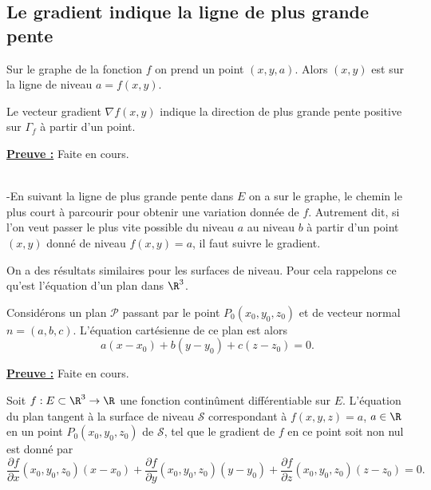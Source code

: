 \documentclass[class=report,crop=false]{standalone}
\begin{document}
\subsection{Le gradient indique la ligne de plus grande pente}
\noindent Sur le graphe de la fonction $f$ on prend un point $(x,y,a)$. Alors $(x,y)$
est sur la ligne de niveau $a=f(x,y)$.

 \begin{proposition}
\textcolor[rgb]{0.50,0.00,0.25}{
Le vecteur gradient $\nabla f(x,y)$ indique la direction de plus grande pente positive sur $\Gamma_f$ à partir d'un point.
}
\end{proposition}

\noindent \underline{\bf Preuve :}
Faite en cours.

  \begin{remarque*}
\textcolor[rgb]{0.00,0.00,1.00}{ \\
-En suivant la ligne de plus grande pente dans $E$ on a sur le graphe, le chemin le plus court
à parcourir pour obtenir une variation donnée de $f$. Autrement dit, si l'on veut passer le plus vite
possible du niveau $a$ au niveau $b$ à partir d'un point $(x,y)$ donné de niveau
$f(x,y)=a$, il faut suivre le gradient.\\
}
\end{remarque*}

\noindent On a des résultats similaires pour les surfaces de niveau. Pour cela rappelons ce qu'est l'équation d'un plan dans $\R^3$.

 \begin{proposition}
\textcolor[rgb]{0.50,0.00,0.25}{
Considérons un plan $\mathscr{P}$ passant par le point $P_0(x_0,y_0,z_0)$ et de vecteur normal $n=(a,b,c)$. L'équation cartésienne de ce plan est alors 
\begin{equation*}
a(x-x_0)+b(y-y_0)+c(z-z_0)=0.
\end{equation*}
}
\end{proposition}

\noindent \underline{\bf Preuve :}
Faite en cours.

 \begin{proposition}
\textcolor[rgb]{0.50,0.00,0.25}{
Soit $f: E \subset  \R^3 \rightarrow \R$ une fonction continûment différentiable sur $E$.
L'équation du plan tangent à la surface de niveau $\mathscr{S}$ correspondant à $f(x,y,z)=a$, $a \in \R$  en un point $P_0(x_0,y_0,z_0)$ de $\mathscr{S}$, tel que le gradient de $f$ en ce point soit non nul est donné par
\begin{equation*}
\dfrac{\partial f}{\partial x}(x_0,y_0,z_0)(x-x_0)+\dfrac{\partial f}{\partial y}(x_0,y_0,z_0)(y-y_0)+\dfrac{\partial f}{\partial z}(x_0,y_0,z_0)(z-z_0)=0.
\end{equation*}
 }
\end{proposition}
\end{document}
